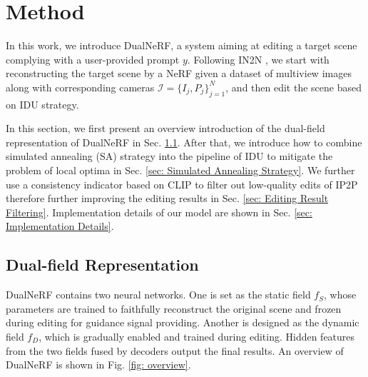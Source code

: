\section{Method}
In this work, we introduce DualNeRF, a system aiming at editing a target scene complying with a user-provided prompt $y$.
Following IN2N \cite{haque2023instruct}, we start with reconstructing the target scene by a NeRF given a dataset of multiview images along with corresponding cameras $\mathcal{I} = \{I_j, P_j\}_{j=1}^{N}$, and then edit the scene based on IDU \cite{haque2023instruct} strategy.

In this section, we first present an overview introduction of the dual-field representation of DualNeRF in Sec. \ref{sec: Dual-field Representation}.
After that, we introduce how to combine simulated annealing (SA) strategy \cite{kirkpatrick1983optimization} into the pipeline of IDU to mitigate the problem of local optima in Sec. \ref{sec: Simulated Annealing Strategy}.
We further use a consistency indicator based on CLIP \cite{radford2021learning} to filter out low-quality edits of IP2P therefore further improving the editing results in Sec. \ref{sec: Editing Result Filtering}.
Implementation details of our model are shown in Sec. \ref{sec: Implementation Details}.

\subsection{Dual-field Representation}
\label{sec: Dual-field Representation}
DualNeRF contains two neural networks. One is set as the static field $f_S$, whose parameters are trained to faithfully reconstruct the original scene and frozen during editing for guidance signal providing. Another is designed as the dynamic field $f_D$, which is gradually enabled and trained during editing. Hidden features from the two fields fused by decoders output the final results. An overview of DualNeRF is shown in Fig. \ref{fig: overview}.


